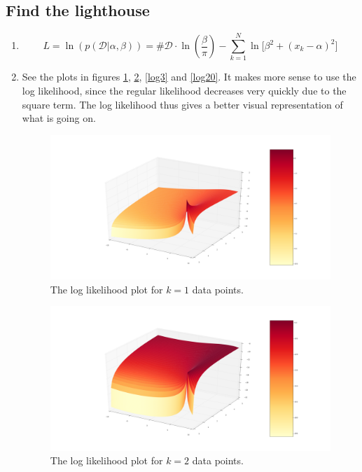 \documentclass[paper=a4, fontsize=10pt]{scrartcl} %
\numberwithin{equation}{section} %
\numberwithin{figure}{section} %
\numberwithin{table}{section} %
\begin{document}
\subsection{Find the lighthouse}
\begin{enumerate}
	\item 

			\begin{equation}
				L = \ln(p(\mathcal{D} \vert \alpha, \beta)) = \#\mathcal{D} \cdot \ln(\frac{\beta}{\pi}) - \sum_{k=1}^N \ln \big[\beta^2 + (x_k - \alpha)^2\big]
			\end{equation}
	\item
			See the plots in figures \ref{log1}, \ref{log2}, \ref{log3} and \ref{log20}. It makes more sense to use the log likelihood, since the regular likelihood decreases very quickly due to the square term. The log likelihood thus gives a better visual representation of what is going on.


			\begin{figure}[H]
				\centering
				\includegraphics[width=\textwidth]{log1.png}
				\caption{The log likelihood plot for $k = 1$ data points.} 
				\label{log1}
			\end{figure}

			\begin{figure}[H]
				\centering
				\includegraphics[width=\textwidth]{log2.png}
				\caption{The log likelihood plot for $k = 2$ data points.} 
				\label{log2}
			\end{figure}


\end{enumerate}
\end{document}

